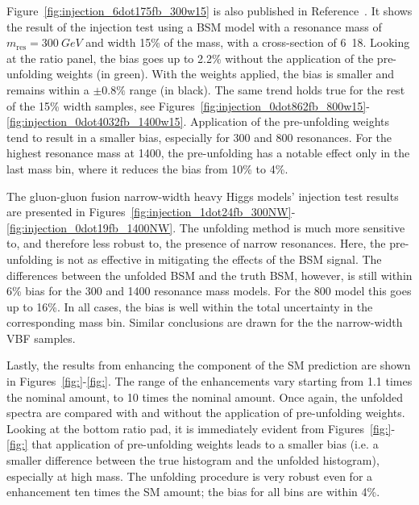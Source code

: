 Figure~\ref{fig:injection_6dot175fb_300w15} is also published in Reference~\cite{m4l2021_paper}. It shows the result of the injection test using a BSM model with a resonance mass of $m_{\mathrm{res}}=300~GeV{}$ and width 15\% of the mass, with a cross-section of \unit{6.18}{\invfb}. Looking at the ratio panel, the bias goes up to 2.2\% without the application of the pre-unfolding weights (in green). With the weights applied, the bias is smaller and remains within a $\pm0.8\%$ range (in black). The same trend holds true for the rest of the 15\% width samples, see Figures~\ref{fig:injection_0dot862fb_800w15}-\ref{fig:injection_0dot4032fb_1400w15}. Application of the pre-unfolding weights tend to result in a smaller bias, especially for \unit{300}{\GeV} and \unit{800}{\GeV} resonances. For the highest resonance mass at \unit{1400}{\GeV}, the pre-unfolding has a notable effect only in the last \mFourL{} mass bin, where it reduces the bias from 10\% to 4\%.

The gluon-gluon fusion narrow-width heavy Higgs models' injection test results are presented in Figures~\ref{fig:injection_1dot24fb_300NW}-\ref{fig:injection_0dot19fb_1400NW}. The unfolding method is much more sensitive to, and therefore less robust to, the presence of narrow resonances. Here, the pre-unfolding is not as effective in mitigating the effects of the BSM signal. The differences between the unfolded BSM and the truth BSM, however, is still within 6\% bias for the \unit{300}{\GeV} and \unit{1400}{\GeV} resonance mass models. For the \unit{800}{\GeV} model this goes up to 16\%. In all cases, the bias is well within the total uncertainty in the corresponding \mFourL{} mass bin. Similar conclusions are drawn for the the narrow-width VBF samples. 

Lastly, the results from enhancing the \ggZZ component of the SM prediction are shown in Figures~\ref{fig:}-\ref{fig:}. The range of the enhancements vary starting from 1.1 times the nominal amount, to 10 times the nominal amount. Once again, the unfolded spectra are compared with and without the application of pre-unfolding weights. Looking at the bottom ratio pad, it is immediately evident from Figures~\ref{fig:}-\ref{fig:} that application of pre-unfolding weights leads to a smaller bias (i.e. a smaller difference between the true histogram and the unfolded histogram), especially at high mass. The unfolding procedure is very robust even for a \ggZZ enhancement ten times the SM amount; the bias for all bins are within 4\%.

